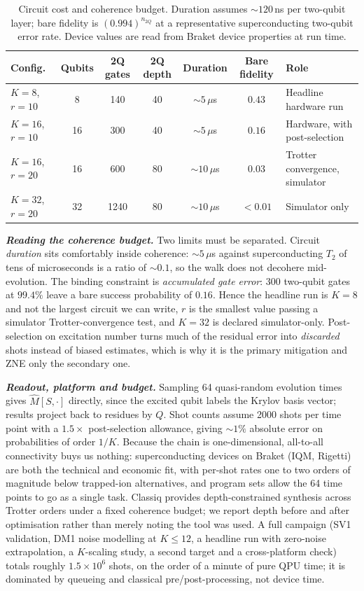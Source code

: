 \documentclass[10pt,a4paper]{article}
\newcommand{\Mhat}{\hat{M}}
\newcommand{\lead}[1]{\textbf{\textit{#1}}}
\begin{document}
\begin{table}[t]
\caption{Circuit cost and coherence budget. Duration assumes ${\sim}120$\,ns per two-qubit layer;
bare fidelity is $(0.994)^{n_{2Q}}$ at a representative superconducting two-qubit error rate. Device
values are read from Braket device properties at run time.}
\footnotesize
\begin{tabularx}{\textwidth}{@{}lcccccX@{}}
\toprule
\textbf{Config.} & \textbf{Qubits} & \textbf{2Q gates} & \textbf{2Q depth} & \textbf{Duration} & \textbf{Bare fidelity} & \textbf{Role}\\
\midrule
$K=8$, $r=10$   & 8  & 140  & 40 & ${\sim}5\,\mu$s  & $0.43$   & Headline hardware run\\
$K=16$, $r=10$  & 16 & 300  & 40 & ${\sim}5\,\mu$s  & $0.16$   & Hardware, with post-selection\\
$K=16$, $r=20$  & 16 & 600  & 80 & ${\sim}10\,\mu$s & $0.03$   & Trotter convergence, simulator\\
$K=32$, $r=20$  & 32 & 1240 & 80 & ${\sim}10\,\mu$s & $<0.01$  & Simulator only\\
\bottomrule
\end{tabularx}
\end{table}

\lead{Reading the coherence budget.} Two limits must be separated. Circuit \emph{duration} sits
comfortably inside coherence: ${\sim}5\,\mu$s against superconducting $T_2$ of tens of microseconds
is a ratio of ${\sim}0.1$, so the walk does not decohere mid-evolution. The binding constraint is
\emph{accumulated gate error}: 300 two-qubit gates at $99.4\%$ leave a bare success probability of
$0.16$. Hence the headline run is $K=8$ and not the largest circuit we can write, $r$ is the smallest
value passing a simulator Trotter-convergence test, and $K=32$ is declared simulator-only. Post-selection on
excitation number turns much of the residual error into \emph{discarded} shots instead of biased estimates,
which is why it is the primary mitigation and ZNE only the secondary one.

\lead{Readout, platform and budget.} Sampling 64 quasi-random evolution times gives $\Mhat[S,\cdot]$
directly, since the excited qubit labels the Krylov basis vector; results project back to residues by
$Q$. Shot counts assume 2000 shots per time point with a $1.5\times$ post-selection allowance, giving
${\sim}1\%$ absolute error on probabilities of order $1/K$. Because the chain is one-dimensional, all-to-all connectivity buys us
nothing: superconducting devices on Braket (IQM, Rigetti) are both the technical and economic fit,
with per-shot rates one to two orders of magnitude below trapped-ion alternatives, and program sets
allow the 64 time points to go as a single task. Classiq provides depth-constrained synthesis across
Trotter orders under a fixed coherence budget; we report depth before and after optimisation rather
than merely noting the tool was used. A full campaign (SV1 validation, DM1 noise modelling at
$K \le 12$, a headline run with zero-noise extrapolation, a $K$-scaling study, a second target and a
cross-platform check) totals roughly $1.5\times10^{6}$ shots, on the order of a minute of pure QPU
time; it is dominated by queueing and classical pre/post-processing, not device time.
\end{document}
